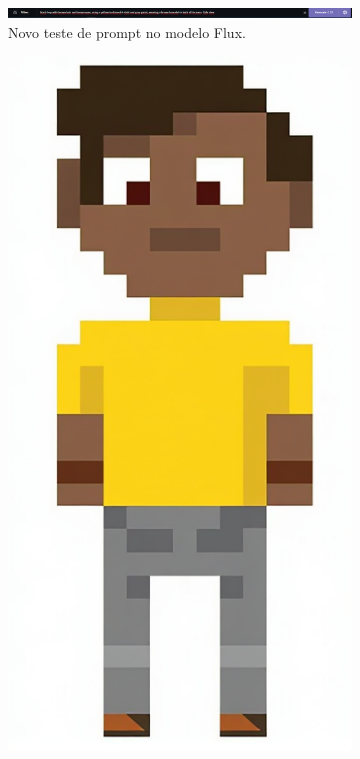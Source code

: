 \begin{figure}[htbp]
\begin{subfigure}{1\linewidth}
        \includegraphics[width=1\linewidth]{figs/cgDream/tela_img_FluxFast2.PNG}
        \caption{\small Novo teste de prompt no modelo Flux.}
        \label{fig:cgDream3d}
    \end{subfigure}
    \begin{subfigure}{0.2\linewidth}
        \includegraphics[width=1\linewidth]{figs/cgDream/res_img_FluxFast2.png}

\end{subfigure}
\end{figure}

